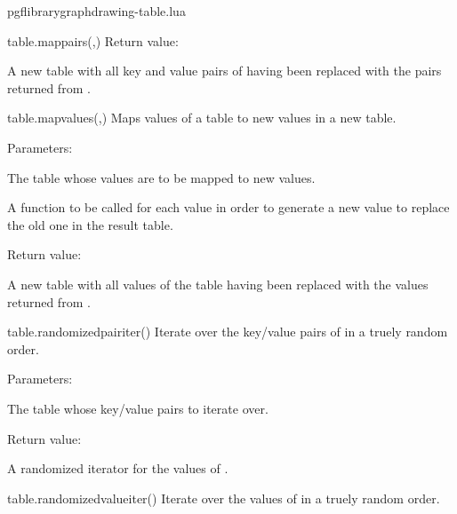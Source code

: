 \begin{filedescription}{pgflibrarygraphdrawing-table.lua}
\begin{luacommand}{{table.map\textunderscore{}pairs}(,)}
Return value:
\begin{parameterdescription} 
  \item[] A new table with all key and value pairs of  having been replaced with the pairs returned from . 
\end{parameterdescription}


\end{luacommand}
\begin{luacommand}{{table.map\textunderscore{}values}(,)}
Maps values of a table to new values in a new table. 

Parameters:
\begin{parameterdescription}
	\item[\meta{input}] The table whose values are to be mapped to new values.\item[\meta{map\_func}] A function to be called for each value in order to generate a new value to replace the old one in the result table. 
\end{parameterdescription}


Return value:
\begin{parameterdescription} 
  \item[] A new table with all values of the  table having been replaced with the values returned from . 
\end{parameterdescription}


\end{luacommand}
\begin{luacommand}{{table.randomized\textunderscore{}pair\textunderscore{}iter}()}
Iterate over the key/value pairs of  in a truely random order. 

Parameters:
\begin{parameterdescription}
	\item[\meta{table}] The table whose key/value pairs to iterate over. 
\end{parameterdescription}


Return value:
\begin{parameterdescription} 
  \item[] A randomized iterator for the values of . 
\end{parameterdescription}


\end{luacommand}
\begin{luacommand}{{table.randomized\textunderscore{}value\textunderscore{}iter}()}
Iterate over the values of  in a truely random order. 


\end{luacommand}
\end{filedescription}
